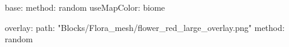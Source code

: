 base:
  method: random
  useMapColor: biome
  
overlay:
  path: "Blocks/Flora_mesh/flower_red_large_overlay.png"
  method: random